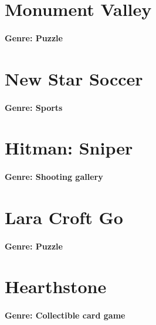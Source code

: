 \section{Monument Valley}
\paragraph{Genre: Puzzle}

\section{New Star Soccer}
\paragraph{Genre: Sports}

\section{Hitman: Sniper}
\paragraph{Genre: Shooting gallery}

\section{Lara Croft Go}
\paragraph{Genre: Puzzle}

\section{Hearthstone}
\paragraph{Genre: Collectible card game}